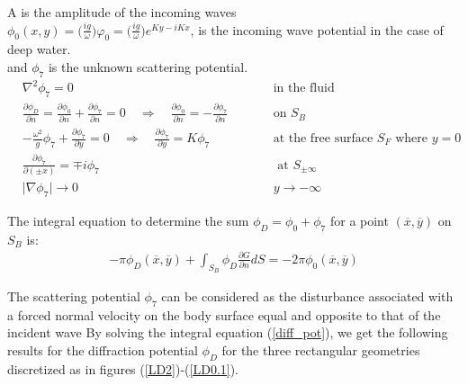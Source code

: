 \documentclass[a4paper,10pt]{article}
\newcommand{\dd}{\partial}
\newcommand{\xbar}{\overline{x}}
\newcommand{\ybar}{\overline{y}}
\begin{document}
A is the amplitude of the incoming waves\\
$\phi_0(x,y) = \big(\frac{ig}{\omega}\big) \varphi_0 = \big(\frac{ig}{\omega}\big) e^{K y - iKx}$, is the incoming wave potential in the case of deep water.\\
and $\phi_7$ is the unknown scattering potential.\\[1 em]

\begin{align}
&\nabla^2 \phi_7 = 0  \quad  \quad && \text{in the fluid}\\
&\frac{\dd \phi_D}{\dd n} = \frac{\dd \phi_0}{\dd n} + \frac{\dd \phi_7}{\dd n}= 0 \quad \Rightarrow \quad \frac{\dd \phi_0}{\dd n} = - \frac{\dd \phi_7}{\dd n} \quad  \quad && \text{on } S_B\\
&-\frac{\omega^2}{g} \phi_7 + \frac{\dd \phi_7}{\dd y} = 0 \quad \Rightarrow \quad \frac{\dd \phi_7}{\dd y} =  K \phi_7 \quad  \quad &&\text{at the free surface } S_F \text{ where } y=0\\
& \frac{\dd \phi_7}{\dd (\pm x)} = \mp i \phi_7 \quad  \quad && \text{ at } S_{\pm \infty}\\
& \vert \nabla \phi_7 \vert \rightarrow 0 \quad  \quad && y \rightarrow - \infty
\end{align} 

The integral equation to determine the sum $\phi_D = \phi_0 + \phi_7$ for a point $(\xbar, \ybar)$ on $S_B$ is:
\begin{align} \label{diff_pot}
- \pi \phi_D(\xbar, \ybar) + \int_{S_B} \phi_D \frac{\dd G}{\dd n}dS = -2 \pi \phi_0(\xbar, \ybar)
\end{align}

The scattering potential $\phi_7$ can be considered as the disturbance associated with a forced normal velocity on the body surface equal and opposite to that of the incident wave
By solving the integral equation (\ref{diff_pot}), we get the following results for the diffraction potential $\phi_D$ for the three rectangular geometries discretized as in figures (\ref{LD2})-(\ref{LD0.1}).
\end{document}
